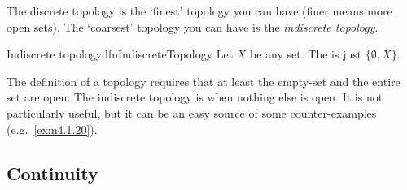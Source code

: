 The discrete topology is the `finest' topology you can have (finer means more open sets).  The `coarsest' topology you can have is the \emph{indiscrete topology}.
\begin{dfn}{Indiscrete topology}{dfnIndiscreteTopology}
Let $X$ be any set.  The  is just $\{ \emptyset ,X\}$.
\begin{rmk}
The definition of a topology requires that at least the empty-set and the entire set are open.  The indiscrete topology is when nothing else is open.  It is not particularly useful, but it can be an easy source of some counter-examples (e.g.~\cref{exm4.1.20}).
\end{rmk}
\end{dfn}

\subsection{Continuity}

